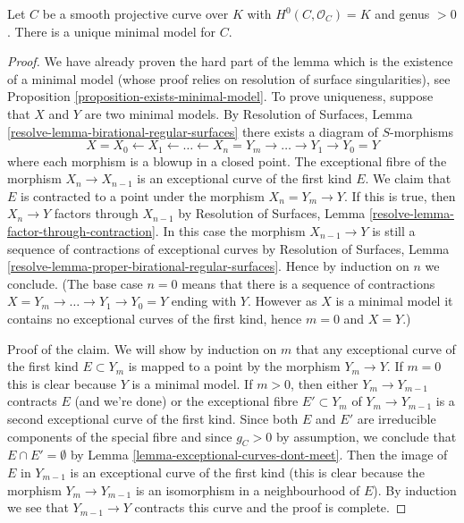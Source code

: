 \begin{lemma}
\label{lemma-minimal-model-unique}
Let $C$ be a smooth projective curve over $K$ with
$H^0(C, \mathcal{O}_C) = K$ and genus $> 0$.
There is a unique minimal model for $C$.
\end{lemma}

\begin{proof}
We have already proven the hard part of the lemma which is the existence
of a minimal model (whose proof relies on
resolution of surface singularities), see
Proposition \ref{proposition-exists-minimal-model}.
To prove uniqueness, suppose that $X$ and $Y$ are two
minimal models. By
Resolution of Surfaces, Lemma \ref{resolve-lemma-birational-regular-surfaces}
there exists a diagram of $S$-morphisms
$$
X = X_0 \leftarrow X_1 \leftarrow \ldots \leftarrow X_n = Y_m
\to \ldots \to Y_1 \to Y_0 = Y
$$
where each morphism is a blowup in a closed point. The
exceptional fibre of the morphism $X_n \to X_{n - 1}$ is an
exceptional curve of the first kind $E$. We claim that $E$ is
contracted to a point under the morphism $X_n = Y_m \to Y$.
If this is true, then $X_n \to Y$ factors through $X_{n - 1}$ by
Resolution of Surfaces, Lemma \ref{resolve-lemma-factor-through-contraction}.
In this case the morphism $X_{n - 1} \to Y$ is still a sequence of
contractions of exceptional curves by
Resolution of Surfaces, Lemma
\ref{resolve-lemma-proper-birational-regular-surfaces}.
Hence by induction on $n$ we conclude. (The base case $n = 0$ means
that there is a sequence of contractions
$X = Y_m \to \ldots \to Y_1 \to Y_0 = Y$
ending with $Y$. However as $X$ is a minimal model it contains
no exceptional curves of the first kind, hence $m = 0$ and $X = Y$.)

\medskip\noindent
Proof of the claim. We will show by induction on $m$ that any exceptional
curve of the first kind $E \subset Y_m$ is mapped to a point
by the morphism $Y_m \to Y$. If $m = 0$ this is clear because
$Y$ is a minimal model. If $m > 0$, then either
$Y_m \to Y_{m - 1}$ contracts $E$ (and we're done) or
the exceptional fibre $E' \subset Y_m$ of $Y_m \to Y_{m - 1}$
is a second exceptional curve of the first kind.
Since both $E$ and $E'$ are irreducible components of the special
fibre and since $g_C > 0$ by assumption, we conclude that
$E \cap E' = \emptyset$ by
Lemma \ref{lemma-exceptional-curves-dont-meet}.
Then the image of $E$ in $Y_{m - 1}$ is an exceptional
curve of the first kind (this is clear because the morphism
$Y_m \to Y_{m - 1}$ is an isomorphism in a neighbourhood of $E$).
By induction we see that $Y_{m - 1} \to Y$ contracts this curve
and the proof is complete.
\end{proof}

